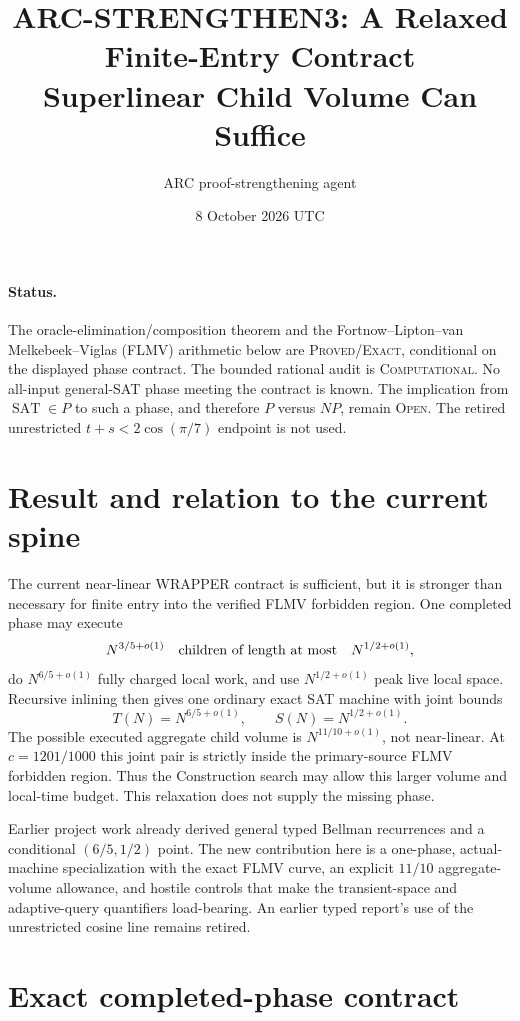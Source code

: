 \documentclass[11pt]{article}
\title{ARC-STRENGTHEN3: A Relaxed Finite-Entry Contract\\Superlinear Child Volume Can Suffice}
\author{ARC proof-strengthening agent}
\date{8 October 2026 UTC}
\newcommand{\SAT}{\operatorname{SAT}}
\begin{document}
\sloppy\maketitle

\paragraph{Status.}
The oracle-elimination/composition theorem and the Fortnow--Lipton--van
Melkebeek--Viglas (FLMV) arithmetic below are \textsc{Proved/Exact}, conditional
on the displayed phase contract.  The bounded rational audit is
\textsc{Computational}.  No all-input general-SAT phase meeting the contract is
known.  The implication from $\SAT\in P$ to such a phase, and therefore
$P$ versus $NP$, remain \textsc{Open}.  The retired unrestricted
$t+s<2\cos(\pi/7)$ endpoint is not used.

\section{Result and relation to the current spine}

The current near-linear WRAPPER contract is sufficient, but it is stronger
than necessary for finite entry into the verified FLMV forbidden region.
One completed phase may execute
\[
  N^{3/5+o(1)}\quad\hbox{children of length at most}\quad N^{1/2+o(1)},
\]
do $N^{6/5+o(1)}$ fully charged local work, and use
$N^{1/2+o(1)}$ peak live local space.  Recursive inlining then gives one
ordinary exact SAT machine with joint bounds
\[
  T(N)=N^{6/5+o(1)},\qquad S(N)=N^{1/2+o(1)}.
\]
The possible executed aggregate child volume is
$N^{11/10+o(1)}$, not near-linear.  At $c=1201/1000$ this joint pair is
strictly inside the primary-source FLMV forbidden region.  Thus the
Construction search may allow this larger volume and local-time budget.
This relaxation does not supply the missing phase.

Earlier project work already derived general typed Bellman recurrences and a
conditional $(6/5,1/2)$ point.  The new contribution here is a one-phase,
actual-machine specialization with the exact FLMV curve, an explicit
$11/10$ aggregate-volume allowance, and hostile controls that make the
transient-space and adaptive-query quantifiers load-bearing.  An earlier
typed report's use of the unrestricted cosine line remains retired.

\section{Exact completed-phase contract}
\end{document}
